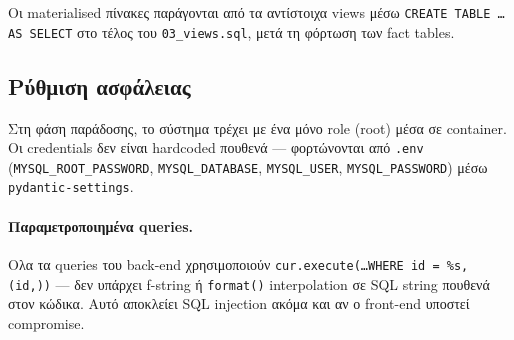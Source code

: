 Οι materialised πίνακες παράγονται από τα αντίστοιχα views μέσω
\texttt{CREATE TABLE \dots AS SELECT} στο τέλος του \texttt{03\_views.sql},
μετά τη φόρτωση των fact tables.

\subsection{Ρύθμιση ασφάλειας}

Στη φάση παράδοσης, το σύστημα τρέχει με ένα μόνο role (root) μέσα σε
container. Οι credentials δεν είναι hardcoded πουθενά --- φορτώνονται από
\texttt{.env} (\texttt{MYSQL\_ROOT\_PASSWORD}, \texttt{MYSQL\_DATABASE},
\texttt{MYSQL\_USER}, \texttt{MYSQL\_PASSWORD}) μέσω
\texttt{pydantic-settings}.

\paragraph{Παραμετροποιημένα queries.} Ολα τα queries του back-end χρησιμοποιούν
\texttt{cur.execute(\dots WHERE id = \%s, (id,))} --- δεν υπάρχει f-string
ή \texttt{format()} interpolation σε SQL string πουθενά στον κώδικα.
Αυτό αποκλείει SQL injection ακόμα και αν ο front-end υποστεί compromise.
